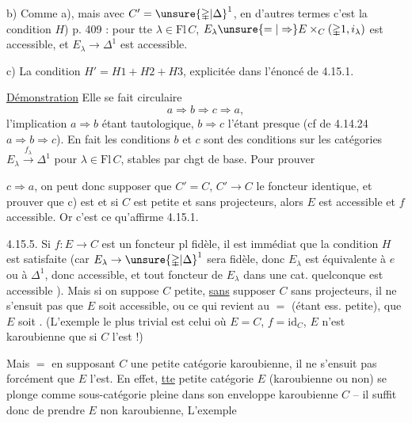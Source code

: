b) Comme a), mais avec $C'=\unsure{\mathbb{\Delta}|\Delta}^{1}$, en d'autres termes c'est la condition $H$) p. 409 : pour tte $\lambda\in\mathrm{Fl}\,C$, $E_\lambda\unsure{=|\Rightarrow}E\times_C(\mathbb{\Delta}1,i_\lambda)$ est accessible, et $E_\lambda\longrightarrow\mathbb{\Delta}^1$ est accessible.

c) La condition $H'=H1+H2+H3$, explicitée dans l'énoncé de 4.15.1.

\uline{Démonstration} Elle se fait circulaire
\[a\Longrightarrow b\Longrightarrow c\Longrightarrow a,\]
l'implication $a\Longrightarrow b$ étant tautologique, $b\Longrightarrow c$ l'étant presque (cf  de 4.14.24 $a\Longrightarrow b\Longrightarrow c$). En fait les conditions $b$ et $c$ sont des conditions sur les catégories $E_\lambda\xrightarrow{f_\lambda}\mathbb{\Delta}^1$ pour $\lambda\in\mathrm{Fl}\,C$,  stables par chgt de base. Pour prouver

$c\Longrightarrow a$,  on peut donc supposer que $C'=C$, $C'\longrightarrow C$ le foncteur identique, et prouver que  c) est  et si $C$ est petite et sans projecteurs, alors $E$ est accessible et $f$ accessible. Or c'est ce qu'affirme 4.15.1.

\uline{} 4.15.5. Si $f:E\longrightarrow C$ est un foncteur pl fidèle, il est immédiat que la condition $H$ est satisfaite (car $E_\lambda\to\unsure{\mathbb{\Delta}|\Delta}^1$ sera  fidèle, donc $E_\lambda$ est équivalente à $e$ ou à $\mathbb{\Delta}^1$, donc accessible, et tout foncteur de $E_\lambda$ dans une cat. quelconque est accessible ).
Mais si on suppose $C$ petite, \uline{sans} supposer $C$ sans projecteurs, il ne s'ensuit pas que $E$ soit accessible,  ou ce qui revient au $=$ (étant ess. petite), que $E$ soit .  (L'exemple le plus trivial est celui où $E=C$, $f=\mathrm{id}_C$, $E$ n'est karoubienne que si  $C$ l'est !)

Mais $=$ en supposant $C$  une petite catégorie karoubienne, il ne s'ensuit pas forcément que $E$ l'est.  En effet, \uline{tte} petite catégorie $E$ (karoubienne ou non) se plonge comme sous-catégorie pleine dans  son enveloppe karoubienne $C$ -- il suffit donc de prendre $E$ non karoubienne, L'exemple

